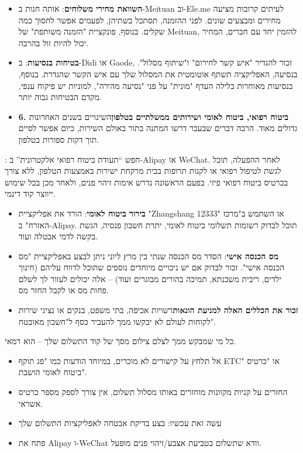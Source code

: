 \begin{itemize}
  \item \textbf{השוואת מחירי משלוחים}: אותה חנות ב-Meituan וב-Ele.me לעיתים קרובות מציעה מחירים ומבצעים שונים. לפני ההזמנה, תסתכל בשתיהן, לפעמים אפשר לחסוך כמה שקלים. בנוסף, פונקציית "הזמנה משותפת" של Meituan, להזמין יחד עם חברים, המחיר יכול להיות זול בהרבה.
  \item \textbf{בטיחות בנסיעות}: ב-Didi או Gaode, זכור להגדיר "איש קשר לחירום" ו"שיתוף מסלול". בנסיעה, האפליקציה תשתף אוטומטית את המסלול שלך עם איש הקשר שהגדרת. בנוסף, בנסיעות מאוחרות בלילה העדף "מונית" על פני "נסיעה מהירה", למוניות יש פיקוח ענפי, מקדם הבטיחות גבוה יותר.
  \item \textbf{6. ביטוח רפואי, ביטוח לאומי ושירותים ממשלתיים בטלפון}השינויים בשנים האחרונות גדולים מאוד. הרבה דברים שבעבר דרשו המתנה בתור באולם השירות, כיום אפשר לסיים תוך דקות ספורות בטלפון.
\end{itemize}


: חפש “תעודת ביטוח רפואי אלקטרונית” ב-Alipay או WeChat. לאחר ההפעלה, תוכל לגשת לטיפול רפואי או לקנות תרופות בבית מרקחת ישירות באמצעות הטלפון, ללא צורך בכרטיס ביטוח רפואי פיזי. בפעם הראשונה נדרש אימות זיהוי פנים, ולאחר מכן בכל שימוש ייווצר קוד דינמי.

\begin{itemize}
  \item \textbf{בירור ביטוח לאומי}: הורד את אפליקציית "Zhangshang 12333" או השתמש ב"מרכז האזרח" ב-Alipay. תוכל לבדוק רשומות תשלומי ביטוח לאומי, יתרת חשבון פנסיה, הגשת בקשה לדמי אבטלה ועוד.
  \item \textbf{מס הכנסה אישי}: הסדר מס הכנסה שנתי בין מרץ ליוני ניתן לבצע באפליקציית "מס הכנסה אישי". זכור לבדוק אם יש ניכויים מיוחדים נוספים שתוכל לדווח עליהם (חינוך ילדים, ריבית משכנתא, תמיכה בהורים מבוגרים ועוד) – אלה יכולים לעזור לך לשלם פחות מס או לקבל החזר מס.
  \item \textbf{זכור את הכללים האלה למניעת הונאות}רשויות אכיפה, בתי משפט, בנקים או נציגי שירות לקוחות לעולם לא יבקשו ממך להעביר כסף ל"חשבון מאובטח".
\end{itemize}

\begin{tcbwarn}{כל מי שמבקש ממך לצלם צילום מסך של קוד התשלום שלך – הוא רמאי.}
\begin{itemize}
  \item אל תלחץ על קישורים לא מוכרים, במיוחד הודעות כמו "פג תוקף ETC" או "כרטיס ביטוח לאומי הושבת".
  \item החזרים על קניות מקוונות מוחזרים באותו מסלול תשלום, אין צורך לספק מספר כרטיס אשראי.
  \item עשה זאת עכשיו: בצע בדיקת אבטחה לאפליקציות התשלום שלך
  \item פתח את Alipay ו-WeChat וודא שתשלום בטביעת אצבע/זיהוי פנים מופעל.
\end{itemize}

\end{tcbwarn}


